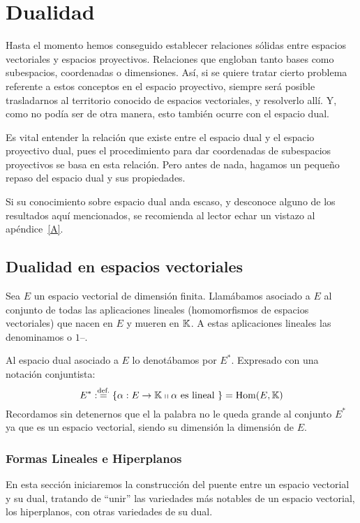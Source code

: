 \chapter{Dualidad}
\label{C2}
Hasta el momento hemos conseguido establecer relaciones sólidas entre espacios vectoriales y espacios proyectivos. Relaciones que engloban tanto bases como subespacios, coordenadas o dimensiones. Así, si se quiere tratar cierto problema referente a estos conceptos en el espacio proyectivo, siempre será posible trasladarnos al territorio conocido de espacios vectoriales, y resolverlo allí. Y, como no podía ser de otra manera, esto también ocurre con el espacio dual. 

Es vital entender la relación que existe entre el espacio dual y el espacio proyectivo dual, pues el procedimiento para dar coordenadas de subespacios proyectivos se basa en esta relación. Pero antes de nada, hagamos un pequeño repaso del espacio dual y sus propiedades.

Si su conocimiento sobre espacio dual anda escaso, y desconoce alguno de los resultados aquí mencionados, se recomienda al lector echar un vistazo al apéndice~\ref{A}.

\section{Dualidad en espacios vectoriales}
\label{C2_dualidadVectoriales}
Sea $E$ un espacio vectorial de dimensión finita. Llamábamos  asociado a $E$ al conjunto de todas las aplicaciones lineales (homomorfismos de espacios vectoriales) que nacen en $E$ y mueren en $\mathbb{K}$. A estas aplicaciones lineales las denominamos  o $1$--.

Al espacio dual asociado a $E$ lo denotábamos por $E^*$. Expresado con una notación conjuntista:
\begin{equation}
	\label{C2_eq_defDual}
	E^*:\stackrel{\textrm{def.}}{=}\{\alpha:E\rightarrow \mathbb{K}\shortparallel \alpha \text{ es lineal }\}=\mathrm{Hom}(E,\mathbb{K})
\end{equation}
Recordamos sin detenernos que el la palabra  no le queda grande al conjunto $E^*$ ya que es un espacio vectorial, siendo su dimensión la dimensión de $E$.
\subsection{Formas Lineales e Hiperplanos}
En esta sección iniciaremos la construcción del puente entre un espacio vectorial y su dual, tratando de ``unir'' las variedades más notables de un espacio vectorial, los hiperplanos, con otras variedades de su dual.
 
